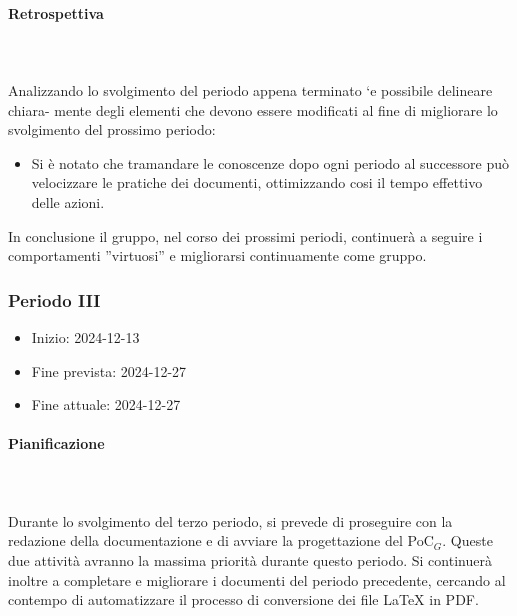 \paragraph{Retrospettiva} \hspace{1cm} 
\\ \hspace{1cm} \\
Analizzando lo svolgimento del periodo appena terminato `e possibile delineare chiara-
mente degli elementi che devono essere modificati al fine di migliorare lo svolgimento del
prossimo periodo:
\begin{itemize}
    \item Si è notato che tramandare le conoscenze dopo ogni periodo al successore può velocizzare le pratiche dei documenti, ottimizzando cosi il tempo effettivo delle azioni.
   
\end{itemize}
In conclusione il gruppo, nel corso dei prossimi periodi, continuerà a seguire i comportamenti ”virtuosi” e migliorarsi continuamente come gruppo.

\subsubsection{Periodo III}

\begin{itemize}
    \item Inizio: 2024-12-13
    \item Fine prevista: 2024-12-27
    \item Fine attuale: 2024-12-27
\end{itemize}
\paragraph{Pianificazione} \hspace{1cm}
\\ \hspace{1cm} \\
Durante lo svolgimento del terzo periodo, si prevede di proseguire con la redazione della documentazione e di avviare la progettazione del PoC$_G$.  
Queste due attività avranno la massima priorità durante questo periodo. Si continuerà inoltre a completare e migliorare i documenti del periodo precedente, cercando al contempo di automatizzare il processo di conversione dei file LaTeX in PDF.  

